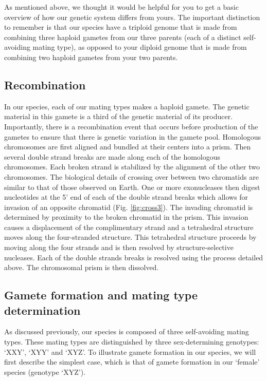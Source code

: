

As mentioned above, we thought it would be helpful for you to get a basic overview of how our genetic system differs from yours. The important distinction to remember is that our species have a triploid genome that is made from combining three haploid gametes from our three parents (each of a distinct self-avoiding mating type), as opposed to your diploid genome that is made from combining two haploid gametes from your two parents.

\subsection*{Recombination}

In our species, each of our mating types makes a haploid gamete. The genetic material in this gamete is a third of the genetic material of its producer. Importantly, there is a recombination event that occurs before production of the gametes to ensure that there is genetic variation in the gamete pool. Homologous chromosomes are first aligned and bundled at their centers into a prism. Then several double strand breaks are made along each of the homologous chromosomes. Each broken strand is stabilized by the alignment of the other two chromosomes. The biological details of crossing over between two chromatids are similar to that of those observed on Earth. One or more exonucleases then digest nucleotides at the 5' end of each of the double strand breaks which allows for invasion of an opposite chromatid (Fig. \ref{fig:cross3}). The invading chromatid is determined by proximity to the broken chromatid in the prism. This invasion causes a displacement of the complimentary strand and a tetrahedral structure moves along the four-stranded structure. This tetrahedral structure proceeds by moving along the four strands and is then resolved by structure-selective nucleases. Each of the double strands breaks is resolved using the process detailed above. The chromosomal prism is then dissolved.       




\subsection*{Gamete formation and mating type determination}
As discussed previously, our species is composed of three self-avoiding mating types. These mating types are distinguished by three sex-determining genotypes: `XXY', `XYY' and `XYZ'. To illustrate gamete formation in our species, we will first describe the simplest case, which is that of gamete formation in our `female' species (genotype `XYZ'). 

